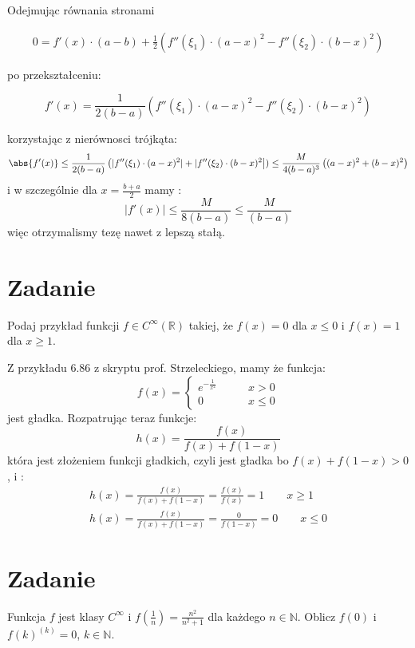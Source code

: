 \documentclass[12pt]{scrartcl}
\begin{document}
    Odejmując równania stronami 

    \begin{gather*}
        0 = f'(x) \cdot (a - b) + \frac{1}{2} \left ( f''(\xi_1) \cdot (a-x)^2 - f''(\xi_2) \cdot (b-x)^2 \right )
    \end{gather*}
    
    po przekształceniu:

    \[
        f'(x) = \frac{1}{2(b-a)} \left ( f''( \xi_1 ) \cdot (a-x)^2 - f''(\xi_2) \cdot (b-x)^2 \right )
    \]
    
    korzystając z nierównosci trójkąta:
    \[
    \abs{f'(x)} \leq \frac{1}{2 (b-a)} \left ( | f''( \xi_1 ) \cdot (a-x)^2 | + | f''(\xi_2) \cdot (b-x)^2 \right | ) \leq \frac{M}{4 (b-a)^3} \left ( (a-x)^2 + (b-x)^2 \right ) 
    \]
    i w szczególnie dla $x = \frac{b+a}{2}$ mamy :
    \[
        |f'(x)| \leq \frac{M}{8(b-a)} \leq \frac{M}{(b-a)}
    \]
    więc otrzymalismy tezę nawet z lepszą stałą.
    \section{Zadanie}
        
    \begin{zadanie}
      Podaj przykład funkcji $f \in C^{\infty }( \mathbb{R} ) $ takiej, że $f (x) = 0$ dla $x \leq 0$ i $f (x) = 1 $ dla $x \geq 1$.
    \end{zadanie}
    
    Z przykładu 6.86 z skryptu prof. Strzeleckiego, mamy że funkcja:
    \[
        f(x) = 
        \begin{cases}
          e^{- \frac{1}{x^2}} \qquad & x > 0 \\
          0 \qquad & x \leq 0
        \end{cases}
    \]
    jest gładka. Rozpatrując teraz funkcje:
    \[
        h(x) = \frac{f(x)}{ f(x) + f(1-x) }
    \]
    która jest złożeniem funkcji gładkich, czyli jest gładka bo $f(x) + f(1-x) > 0$, i :
    \begin{gather*}
      h(x) = \frac{f(x)}{f(x) + f(1-x)} = \frac{f(x)}{f(x)} = 1 \qquad  x \geq 1 \\
      h(x) = \frac{f(x)}{f(x) + f(1-x)} = \frac{0}{f(1-x)} = 0 \qquad  x \leq 0
    \end{gather*}
    \section{Zadanie}
        
    \begin{zadanie}
      Funkcja $f$ jest klasy $C^{\infty }$ i $f ( \frac{1}{n} ) = \frac{n^2}{n^2 + 1}$ dla każdego $n \in \mathbb{N}$. Oblicz $f (0)$ i $f (k)^{(k)} = 0$, $k \in \mathbb{N}$.
    \end{zadanie}
\end{document}
